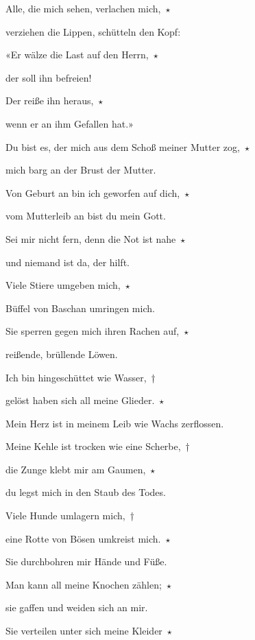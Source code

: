 \noindent Alle, die mich sehen, verlachen mich,~$\star$~\nopagebreak

verziehen die Lippen, schütteln den Kopf:
 
\noindent «Er wälze die Last auf den Herrn,~$\star$~\nopagebreak

der soll ihn befreien! 
 
\noindent Der reiße ihn heraus,~$\star$~\nopagebreak

wenn er an ihm Gefallen hat.»
 
\noindent Du bist es, der mich aus dem Schoß meiner Mutter zog,~$\star$~\nopagebreak

mich barg an der Brust der Mutter.
 
\noindent Von Geburt an bin ich geworfen auf dich,~$\star$~\nopagebreak

vom Mutterleib an bist du mein Gott.
 
\noindent Sei mir nicht fern, denn die Not ist nahe~$\star$~\nopagebreak

und niemand ist da, der hilft.
 
\noindent Viele Stiere umgeben mich,~$\star$~\nopagebreak

Büffel von Baschan umringen mich.
 
\noindent Sie sperren gegen mich ihren Rachen auf,~$\star$~\nopagebreak

reißende, brüllende Löwen.
 
\noindent Ich bin hingeschüttet wie Wasser,~†~\nopagebreak

gelöst haben sich all meine Glieder.~$\star$~\nopagebreak

Mein Herz ist in meinem Leib wie Wachs zerflossen.
 
\noindent Meine Kehle ist trocken wie eine Scherbe,~†~\nopagebreak

die Zunge klebt mir am Gaumen,~$\star$~\nopagebreak

du legst mich in den Staub des Todes.
 
\noindent Viele Hunde umlagern mich,~†~\nopagebreak

eine Rotte von Bösen umkreist mich.~$\star$~\nopagebreak

Sie durchbohren mir Hände und Füße.
 
\noindent Man kann all meine Knochen zählen;~$\star$~\nopagebreak

sie gaffen und weiden sich an mir.
 
\noindent Sie verteilen unter sich meine Kleider~$\star$~\nopagebreak

